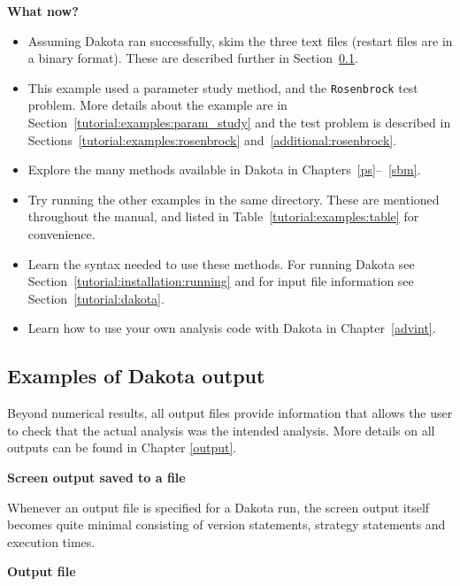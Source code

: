 {\bf What now?}
\begin{itemize}
  \item Assuming Dakota ran successfully, skim the three text files (restart files are in a binary format). These are described further in 
Section~\ref{tutorial:quickstart:output}.
  \item This example used a parameter study method, and the 
\texttt{Rosenbrock} test problem. More details about the example are in
Section~\ref{tutorial:examples:param_study} and the test problem is 
described in Sections~\ref{tutorial:examples:rosenbrock} and~\ref{additional:rosenbrock}.
  \item Explore the many methods available in Dakota in
    Chapters~\ref{ps}--~\ref{sbm}.
  \item Try running the other examples in the same directory. These are mentioned
    throughout the manual, and listed in Table~\ref{tutorial:examples:table} 
    for convenience.
  \item Learn the syntax needed to use these methods. For running Dakota 
see Section~\ref{tutorial:installation:running} and for input file 
information see Section~\ref{tutorial:dakota}. 
  \item Learn how to use your own analysis code with Dakota in Chapter~\ref{advint}.
\end{itemize}


\subsection {Examples of Dakota output}\label{tutorial:quickstart:output}
Beyond numerical results, all output files provide information that
allows the user to check that the actual analysis was the intended
analysis. More details on all outputs can be found in Chapter \ref{output}.

{\textbf{Screen output saved to a file}}

Whenever an output file is specified for a Dakota run, the screen output
itself becomes quite minimal 
consisting of version statements, strategy statements
and execution times.

{\textbf{Output file}}

